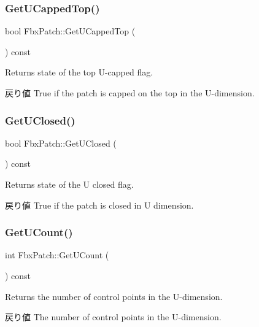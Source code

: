 \subsubsection{\texorpdfstring{Get\+U\+Capped\+Top()}{GetUCappedTop()}}
{\footnotesize\ttfamily bool Fbx\+Patch\+::\+Get\+U\+Capped\+Top (\begin{DoxyParamCaption}{ }\end{DoxyParamCaption}) const}

Returns state of the top U-\/capped flag. \begin{DoxyReturn}{戻り値}
{\ttfamily True} if the patch is capped on the top in the U-\/dimension. 
\end{DoxyReturn}
\mbox{\label{class_fbx_patch_aa4f5d7f204475afe6cd5160e7081eeef}} 
\subsubsection{\texorpdfstring{Get\+U\+Closed()}{GetUClosed()}}
{\footnotesize\ttfamily bool Fbx\+Patch\+::\+Get\+U\+Closed (\begin{DoxyParamCaption}{ }\end{DoxyParamCaption}) const}

Returns state of the U closed flag. \begin{DoxyReturn}{戻り値}
{\ttfamily True} if the patch is closed in U dimension. 
\end{DoxyReturn}
\mbox{\label{class_fbx_patch_a4b9ff1fdd6b7ec569f37f4f56a4bb926}} 
\subsubsection{\texorpdfstring{Get\+U\+Count()}{GetUCount()}}
{\footnotesize\ttfamily int Fbx\+Patch\+::\+Get\+U\+Count (\begin{DoxyParamCaption}{ }\end{DoxyParamCaption}) const}

Returns the number of control points in the U-\/dimension. \begin{DoxyReturn}{戻り値}
The number of control points in the U-\/dimension. 
\end{DoxyReturn}
\mbox{\label{class_fbx_patch_a875381a084e1b98773fff2bfddcae827}} 
